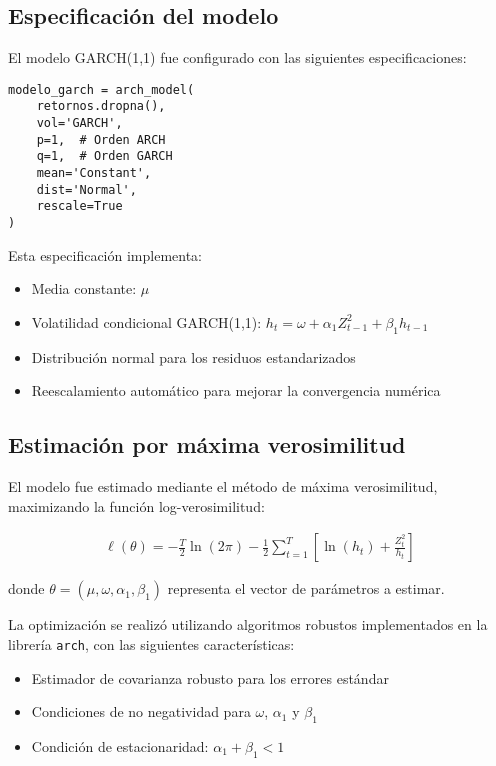 \subsection{Especificación del modelo}

El modelo GARCH(1,1) fue configurado con las siguientes especificaciones:

\begin{verbatim}
modelo_garch = arch_model(
    retornos.dropna(),
    vol='GARCH',
    p=1,  # Orden ARCH
    q=1,  # Orden GARCH
    mean='Constant',
    dist='Normal',
    rescale=True
)
\end{verbatim}

Esta especificación implementa:
\begin{itemize}
    \item Media constante: $\mu$
    \item Volatilidad condicional GARCH(1,1): $h_t = \omega + \alpha_1 Z_{t-1}^2 + \beta_1 h_{t-1}$
    \item Distribución normal para los residuos estandarizados
    \item Reescalamiento automático para mejorar la convergencia numérica
\end{itemize}

\subsection{Estimación por máxima verosimilitud}

El modelo fue estimado mediante el método de máxima verosimilitud, maximizando la función log-verosimilitud:

\begin{align}
    \ell(\theta) = -\frac{T}{2}\ln(2\pi) - \frac{1}{2}\sum_{t=1}^{T}\left[\ln(h_t) + \frac{Z_t^2}{h_t}\right]
\end{align}

donde $\theta = (\mu, \omega, \alpha_1, \beta_1)$ representa el vector de parámetros a estimar.

La optimización se realizó utilizando algoritmos robustos implementados en la librería \texttt{arch}, con las siguientes características:
\begin{itemize}
    \item Estimador de covarianza robusto para los errores estándar
    \item Condiciones de no negatividad para $\omega$, $\alpha_1$ y $\beta_1$
    \item Condición de estacionaridad: $\alpha_1 + \beta_1 < 1$
\end{itemize}

